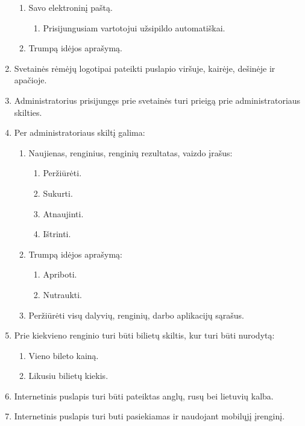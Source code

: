 \documentclass{VUMIFPSkursinis}
\begin{document}
\begin{enumerate}[label=\textbf{FR\arabic*}]
					\begin{enumerate}[label*=\textbf{.\arabic*}]
						\item Savo elektroninį paštą.
						    \begin{enumerate}[label*=\textbf{.\arabic*}]
						        \item Prisijungusiam vartotojui užsipildo automatiškai.
						    \end{enumerate}
						\item Trumpą idėjos aprašymą.
					\end{enumerate}
				\item Svetainės rėmėjų logotipai pateikti puslapio viršuje, kairėje, dešinėje ir apačioje.
				\item Administratorius prisijungęs prie svetainės turi prieigą prie administratoriaus skilties.
				\item Per administratoriaus skiltį galima:
					\begin{enumerate}[label*=\textbf{.\arabic*}]
						\item Naujienas, renginius, renginių rezultatas, vaizdo įrašus:
						    \begin{enumerate}[label*=\textbf{.\arabic*}]
						        \item Peržiūrėti.
						        \item Sukurti.
						        \item Atnaujinti.
						        \item Ištrinti.
						    \end{enumerate}
						\item Trumpą idėjos aprašymą:
                            \begin{enumerate}[label*=\textbf{.\arabic*}]
						        \item Apriboti.
						        \item Nutraukti.
						    \end{enumerate}
						\item Peržiūrėti visų dalyvių, renginių, darbo aplikacijų sąrašus.
					\end{enumerate}
			    \item Prie kiekvieno renginio turi būti bilietų skiltis, kur turi būti nurodytą:
					\begin{enumerate}[label*=\textbf{.\arabic*}]
						\item Vieno bileto kainą.
						\item Likusiu bilietų kiekis.
					\end{enumerate}
				\item Internetinis puslapis turi būti pateiktas anglų, rusų bei lietuvių kalba.
				\item  Internetinis puslapis turi buti pasiekiamas ir naudojant mobilųjį įrenginį.
			\end{enumerate}
\end{document}
